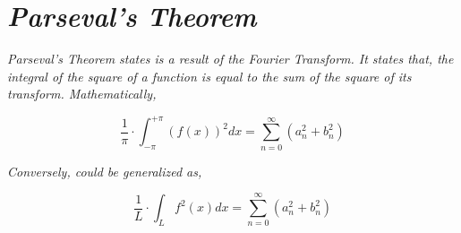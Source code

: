 

\section{\textit{Parseval's Theorem}}

	\textit{Parseval's Theorem states is a result of the Fourier Transform. It states that, the integral of the square of a function is equal to the sum of the square of its transform. Mathematically,}
	
		$$\frac{1}{\pi}\cdot\int_{-\pi}^{+\pi} \left(f(x)\right)^2 dx = \sum_{n=0}^{\infty}\left(a_{n}^2 + b_{n}^2\right)$$

	\textit{Conversely, could be generalized as,}

		$$\frac{1}{L}\cdot\int_{L} f^2(x) dx = \sum_{n=0}^{\infty}\left(a_{n}^2 + b_{n}^2\right)$$



